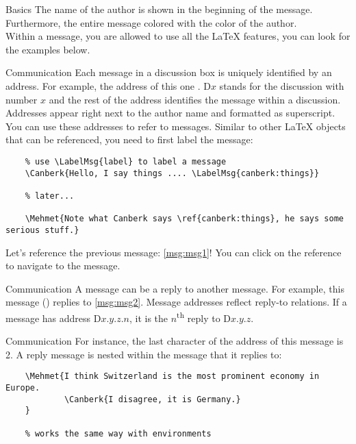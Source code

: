 \documentclass{article}
\begin{document}
\begin{discussionbox}
\begin{dboxmsg}{Basics}
    \noindent The name of the author is shown in the beginning of the message.
    Furthermore, the entire message colored with the color of the author.\\
    Within a message, you are allowed to use all the \LaTeX{} features, you can look for the examples below.
    \end{dboxmsg}

    \begin{dboxmsg}{Communication}
        Each message in a discussion box is uniquely identified by an address.
        For example, the address of this one .
        D$x$ stands for the discussion with number $x$ and the rest of the address identifies the message within a discussion.
        Addresses appear right next to the author name and formatted as superscript.
        You can use these addresses to refer to messages.
        Similar to other \LaTeX{} objects that can be referenced, you need to first label the message:

        \begin{verbatim}
    % use \LabelMsg{label} to label a message
    \Canberk{Hello, I say things .... \LabelMsg{canberk:things}}

    % later...

    \Mehmet{Note what Canberk says \ref{canberk:things}, he says some serious stuff.}
        \end{verbatim}
        
        \noindent Let's reference the previous message: \ref{msg:msg1}!
        You can click on the reference to navigate to the message.

        \begin{dboxmsg}{Communication}
            A message can be a reply to another message.
            For example, this message () replies to \ref{msg:msg2}.
            Message addresses reflect reply-to relations.
            If a message has address D$x$.$y$.$z$.$n$, it is the $n$\textsuperscript{th} reply to D$x$.$y$.$z$.
        \end{dboxmsg}
        \begin{dboxmsg}{Communication}
            For instance, the last character of the address of this message is 2.
            A reply message is nested within the message that it replies to:
            \begin{verbatim}
    \Mehmet{I think Switzerland is the most prominent economy in Europe.
            \Canberk{I disagree, it is Germany.}
    }

    % works the same way with environments
            \end{verbatim}
        \end{dboxmsg}
    \end{dboxmsg}
\end{discussionbox}


\end{document}
